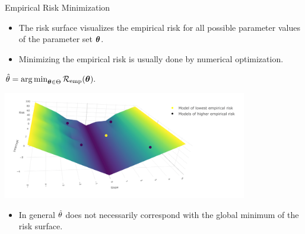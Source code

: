 \documentclass[11pt,compress,t,notes=noshow, xcolor=table]{beamer}
\begin{document}
\begin{vbframe}{Empirical Risk Minimization}

\begin{itemize}
\item \small The risk surface visualizes the empirical risk for all possible parameter values of the parameter set $\bm{\theta}$.
\item \small Minimizing the empirical risk is usually done by numerical optimization.
\end{itemize}

\begin{center}
$
\hat{\theta} = \operatorname{arg\,min}_{\bm{\theta} \in \Theta} \mathcal{R}_{\text{emp}}(\bm{\theta}).
$
\end{center}


\begin{center}
 \includegraphics[width = 0.8\textwidth]{slides/ml-basics/figure_man/nutshell-ml-basics-risk-surface.png}
\end{center}


\begin{itemize}
\item \small In general $\hat{\theta}$ does not necessarily correspond with the global minimum of the risk surface.
\end{itemize}



\end{vbframe}
\end{document}
